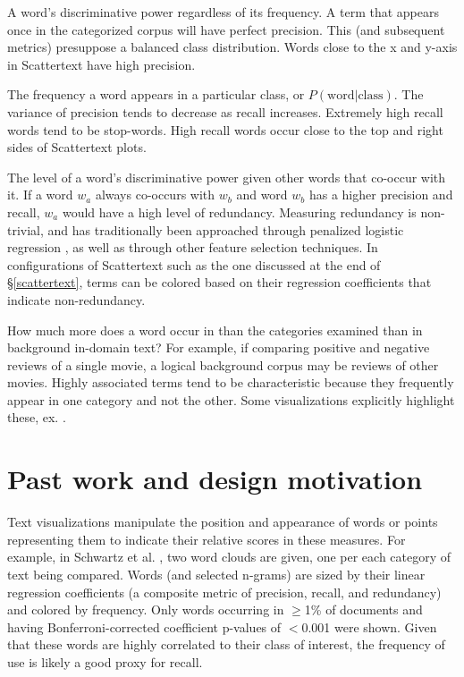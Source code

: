 \documentclass[11pt,a4paper]{article}
\begin{document}
\begin{description}[style=unboxed,leftmargin=0cm]
\item[Precision] A word's discriminative power regardless of its frequency.  A term that appears once in the categorized corpus will have perfect precision. This (and subsequent metrics) presuppose a balanced class distribution.  Words close to the x and y-axis in Scattertext have high precision.  \vspace{-0.1in}
\item[Recall] The frequency a word appears in a particular class, or $P(\mbox{word}|\mbox{class})$.  The variance of precision tends to decrease as recall increases.  Extremely high recall words tend to be stop-words.  High recall words occur close to the top and right sides of Scattertext plots.  \vspace{-0.1in}
\item[Non-redundancy] The level of a word's discriminative power given other words that co-occur with it.  If a word $w_a$ always co-occurs with $w_b$ and word $w_b$ has a higher precision and recall, $w_a$ would have a high level of redundancy. Measuring redundancy is non-trivial, and has traditionally been approached through penalized logistic regression \cite{joshi2010}, as well as through other feature selection techniques.  In configurations of Scattertext such as the one discussed at the end of \S\ref{scattertext}, terms can be colored based on their regression coefficients that indicate non-redundancy.  \vspace{-0.1in}
\item[Characteristicness] How much more does a word occur in than the categories examined than in background in-domain text?  For example, if comparing positive and negative reviews of a single movie, a logical background corpus may be reviews of other movies. Highly associated terms tend to be characteristic because they frequently appear in one category and not the other. Some visualizations explicitly highlight these, ex. \cite{vennclouds}. \vspace{-0.1in}
\end{description}
\section{Past work and design motivation}
\label{pastwork}
Text visualizations manipulate the position and appearance of words or points representing them to indicate their relative scores in these measures. For example, in Schwartz et al. , two word clouds are given, one per each category of text being compared.  Words (and selected n-grams) are sized by their linear regression coefficients (a composite metric of precision, recall, and redundancy) and colored by frequency. Only words occurring in $\geq$1\% of documents and having Bonferroni-corrected coefficient p-values of $<$0.001 were shown. Given that these words are highly correlated to their class of interest, the frequency of use is likely a good proxy for recall.
\end{document}
